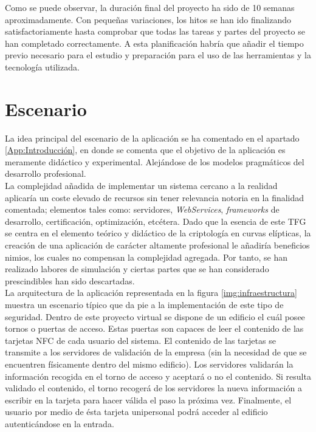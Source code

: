 \documentclass[../PFC.tex]{subfiles}
\begin{document}
Como se puede observar, la duración final del proyecto ha sido de 10 semanas aproximadamente. Con pequeñas variaciones, los hitos se han ido finalizando satisfactoriamente hasta comprobar que todas las tareas y partes del proyecto se han completado correctamente. A esta planificación habría que añadir el tiempo previo necesario para el estudio y preparación para el uso de las herramientas y la tecnología utilizada.

\section{Escenario}
\label{App:Escenario}

La idea principal del escenario de la aplicación se ha comentado en el apartado \ref{App:Introducción}, en donde se comenta que el objetivo de la aplicación es meramente didáctico y experimental. Alejándose de los modelos pragmáticos del desarrollo profesional. 
\*
\vspace{0.5515cm}
\\
La complejidad añadida de implementar un sistema cercano a la realidad aplicaría un coste elevado de recursos sin tener relevancia notoria en la finalidad comentada; elementos tales como: servidores, \textit{WebServices}, \textit{frameworks} de desarrollo, certificación, optimización, etcétera. Dado que la esencia de este TFG se centra en el elemento teórico y didáctico de la criptología en curvas elípticas, la creación de una aplicación de carácter altamente profesional le añadiría beneficios nimios, los cuales no compensan la complejidad agregada. Por tanto, se han realizado labores de simulación y ciertas partes que se han considerado prescindibles han sido descartadas.
\*
\vspace{0.5515cm}
\\
La arquitectura de la aplicación representada en la figura \ref{img:infraestructura} muestra un escenario típico que da pie a la implementación de este tipo de seguridad. Dentro de este proyecto virtual se dispone de un edificio el cuál posee tornos o puertas de acceso. Estas puertas son capaces de leer el contenido de las tarjetas NFC de cada usuario del sistema. El contenido de las tarjetas se transmite a los servidores de validación de la empresa (sin la necesidad de que se encuentren físicamente dentro del mismo edificio). Los servidores validarán la información recogida en el torno de acceso y aceptará o no el contenido. Si resulta validado el contenido, el torno recogerá de los servidores la nueva información a escribir en la tarjeta para hacer válida el paso la próxima vez. Finalmente, el usuario por medio de ésta tarjeta unipersonal podrá acceder al edificio autenticándose en la entrada.
\end{document}
